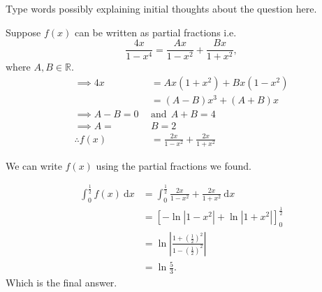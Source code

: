 \documentclass[a4paper, 11pt]{article}
\begin{document}
        \begin{solution}
            Type words possibly explaining initial thoughts about the question here.

            \begin{solutionparts}
                \item Suppose \(f(x) \) can be written as partial fractions i.e. 
                \[ \frac{4x}{1-x^4} = \frac{Ax }{1 -x^2} + \frac{Bx }{1 + x^2},  \] where \(A, B \in \mathbb{R }\). 
                \begin{align*}
                    \implies 4x &= Ax(1+x^2) + Bx(1-x^2) \\
                    &= (A-B)x^3 + (A+B)x \\
                    \implies A - B = 0 ~~&\text{and}~~ A+B = 4 \\
                    \implies A = ~&B = 2 \\
                    \therefore f(x) &= \frac{2x}{1 - x^2} + \frac{2x}{1 + x^2}
                \end{align*}

                \item We can write \(f(x) \) using the partial fractions we found.
                
                \begin{align*}
                    \int_{0}^{\frac{1}{2}} f(x) ~ \mathrm{d} x  &= \int_{0}^{\frac{1}{2}} \frac{2x}{1 - x^2} + \frac{2x}{1 + x^2} ~ \mathrm{d} x \\
                    &= \left[ - \ln \left| 1 - x^2 \right| + \ln \left|1 + x^2 \right|\right]_0^\frac{1}{2} \\
                    &= \ln \left| \frac{1+ \left(\frac{1}{2}\right)^2}{1 - \left(\frac{1}{2}\right)^2}\right| \\
                    &= \ln \frac{5}{3}.
                \end{align*}
                Which is the final answer. 
            \end{solutionparts}
        \end{solution}
\end{document}
